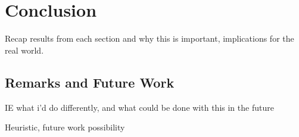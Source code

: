 \documentclass[a4paper,12pt,twoside,openright]{report}
\begin{document}
\chapter{Conclusion} 

Recap results from each section and why this is important, 
implications for the real world.



\section{Remarks and Future Work}

IE what i'd do differently, and what could be done with this in the future

Heuristic, future work possibility



\appendix
\singlespacing

\printbibliography
\end{document}
